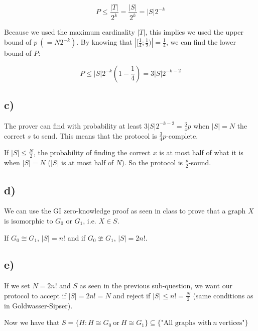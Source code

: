 \documentclass{scrartcl}
\begin{document}
\begin{equation*}
    P \leq \frac{|T|}{2^k} = \frac{|S|}{2^k} = |S|2^{-k}
\end{equation*}

Because we used the maximum cardinality $|T|$, this implies we used the upper bound of $p\ (= N2^{-k})$. By knowing that $|[\frac{1}{4}; \frac{1}{2})| = \frac{1}{4}$, we can find the lower bound of $P$:

\begin{equation*}
    P \leq |S|2^{-k}\left(1- \frac{1}{4} \right) = 3|S|2^{-k-2}
\end{equation*}


\subsection*{c)}

The prover can find with probability at least $3|S|2^{-k-2} = \frac{3}{4}p$ when $|S| = N$ the correct $s$ to send. This means that the protocol is $\frac{3}{4}p$-complete.

If $|S| \leq \frac{N}{2}$, the probability of finding the correct $x$ is at most half of what it is when $|S| = N$ ($|S|$ is at most half of $N$). So the protocol is $\frac{p}{2}$-sound. 


\subsection*{d)}

We can use the GI zero-knowledge proof as seen in class to prove that a graph $X$ is isomorphic to $G_0$ or $G_1$, i.e. $X \in S$.

If $G_0 \cong G_1$, $|S| = n!$ and if $G_0 \ncong G_1$, $|S| = 2n!$.

\subsection*{e)}

If we set $N = 2n!$ and $S$ as seen in the previous sub-question, we want our protocol to accept if $|S| = 2n! = N$ and reject if $|S| \leq n! = \frac{N}{2}$ (same conditions as in Goldwasser-Sipser).

Now we have that $S = \{H : H \cong G_0 \ \text{or}\ H \cong G_1 \} \subseteq \{\text{"All graphs with}\ n \ \text{vertices"}\}$
\end{document}
